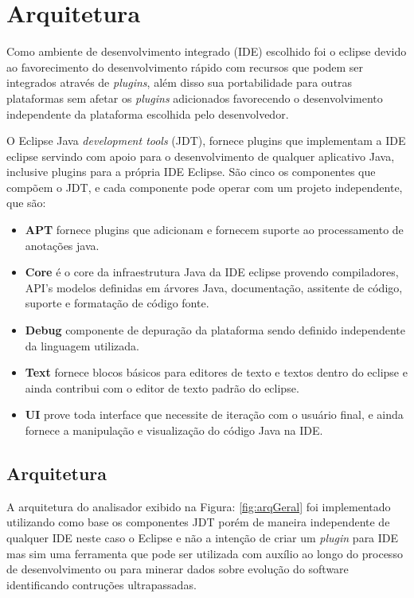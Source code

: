 \chapter {Arquitetura}
Como ambiente de desenvolvimento integrado (IDE) escolhido foi o eclipse devido ao favorecimento do desenvolvimento rápido com recursos que podem ser integrados através de {\it plugins}, além disso sua portabilidade para outras plataformas sem afetar os {\it plugins} adicionados favorecendo o desenvolvimento independente da plataforma escolhida pelo desenvolvedor.

O Eclipse Java {\it development tools} (JDT), fornece plugins que implementam a IDE eclipse servindo com apoio para o desenvolvimento de qualquer aplicativo Java, inclusive plugins para a própria IDE Eclipse. São cinco os componentes que compõem o JDT, e cada componente pode operar com um projeto independente, que são:

	\begin{itemize}
		\item \textbf{APT} fornece plugins que adicionam e fornecem suporte ao processamento de anotações java.
		\item \textbf{Core} é o core da infraestrutura Java da IDE eclipse provendo compiladores, API's modelos definidas em árvores Java, documentação, assitente de código, suporte e formatação de código fonte.
		\item \textbf{Debug} componente de depuração da plataforma sendo definido independente da linguagem utilizada.
		\item \textbf{Text} fornece blocos básicos para editores de texto e textos dentro do eclipse e ainda contribui com o editor de texto padrão do eclipse. \item \textbf{UI} prove toda interface que necessite de iteração com o usuário final, e ainda fornece a manipulação e visualização do código Java na IDE.
	\end{itemize} 
	

\section {Arquitetura}
A arquitetura do analisador exibido na Figura: \ref{fig:arqGeral} foi implementado utilizando como base os componentes \acs{JDT} porém de maneira independente de qualquer \acs{IDE} neste caso o Eclipse e não a intenção de criar um {\it plugin} para \acs{IDE} mas sim uma ferramenta que pode ser utilizada com auxílio ao longo do processo de desenvolvimento ou para minerar dados sobre evolução do software identificando contruções ultrapassadas.

